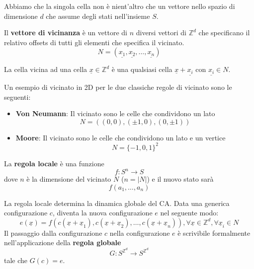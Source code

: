 Abbiamo che la singola cella non è nient'altro che un vettore nello spazio di dimensione
$d$ che assume degli stati nell'insieme $S$.

\begin{definizione}
    Il \textbf{vettore di vicinanza} è un vettore di $n$ diversi vettori di $\mathbb{Z}^d$
    che specificano il relativo offsets di tutti gli elementi che specifica il
    vicinato.
    $$N=\left(\underline{x_1},\underline{x_2},\dots,\underline{x_n}\right)$$
\end{definizione}

La cella vicina ad una cella $\underline{x }\in \mathbb{Z}^d$ è una qualsiasi cella $\underline{x}+\underline{x_i}$
con $\underline{x_i} \in N$.

\begin{esempio}
    Un esempio di vicinato in 2D per le due classiche regole di vicinato sono
    le seguenti:
    \begin{itemize}
        \item \textbf{Von Neumann}: Il vicinato sono le celle che condividono un
              lato
              $$N=\left(\left(0,0\right),\left(\pm 1,0\right), \left(0,\pm 1\right)\right)$$
        \item \textbf{Moore}: Il vicinato sono le celle che condividono un
              lato e un vertice
              $$N=\{-1,0,1\}^2$$
    \end{itemize}
\end{esempio}

\begin{definizione}
    La \textbf{regola locale} è una funzione
    $$f:S^n\rightarrow S$$
    dove $n$ è la dimensione del vicinato $N$ ($n=|N|$) e il nuovo stato sarà
    $$f(a_1,\dots,a_n)$$
\end{definizione}

\begin{definizione}
    La regola locale determina la dinamica globale del CA. Data una generica
    configurazione $c$, diventa la nuova configurazione $e$ nel seguente modo:
    $$e(\underline{x}) = f(c(\underline{x}+ \underline{x}_1),c(\underline{x}+ \underline{x}_2),\dots, c(\underline{x}+ \underline{x}_n)), \forall \underline{x}\in \mathbb{Z}^d, \forall \underline{x}_i\in N$$
    Il passaggio dalla configurazione $c$ nella configurazione $e$ è scrivibile
    formalmente nell'applicazione della \textbf{regola globale}
    $$G:S^{\mathbb{Z}^d}\rightarrow S^{\mathbb{Z}^d} $$
    tale che $G(c) = e$.
\end{definizione}

